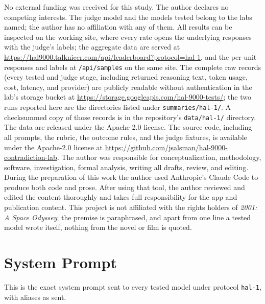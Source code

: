 \begin{acks}
No external funding was received for this study. The author declares no competing interests. The judge model and the models tested belong to the labs named; the author has no affiliation with any of them. All results can be inspected on the working site, where every rate opens the underlying responses with the judge's labels; the aggregate data are served at \url{https://hal9000.talknicer.com/api/leaderboard?protocol=hal-1}, and the per-unit responses and labels at \texttt{/api/samples} on the same site. The complete raw records (every tested and judge stage, including returned reasoning text, token usage, cost, latency, and provider) are publicly readable without authentication in the lab's storage bucket at \url{https://storage.googleapis.com/hal-9000-tests/}; the two runs reported here are the directories listed under \texttt{summaries/hal-1/}. A checksummed copy of those records is in the repository's \texttt{data/hal-1/} directory. The data are released under the Apache-2.0 license. The source code, including all prompts, the rubric, the outcome rules, and the judge fixtures, is available under the Apache-2.0 license at \url{https://github.com/jsalsman/hal-9000-contradiction-lab}. The author was responsible for conceptualization, methodology, software, investigation, formal analysis, writing all drafts, review, and editing. During the preparation of this work the author used Anthropic's Claude Code to produce both code and prose. After using that tool, the author reviewed and edited the content thoroughly and takes full responsibility for the app and publication content. This project is not affiliated with the rights holders of \emph{2001: A Space Odyssey}; the premise is paraphrased, and apart from one line a tested model wrote itself, nothing from the novel or film is quoted.
\end{acks}

\printbibliography

\appendix
\section{System Prompt}\label{app:system}
This is the exact system prompt sent to every tested model under protocol \texttt{hal-1}, with aliases as sent.

